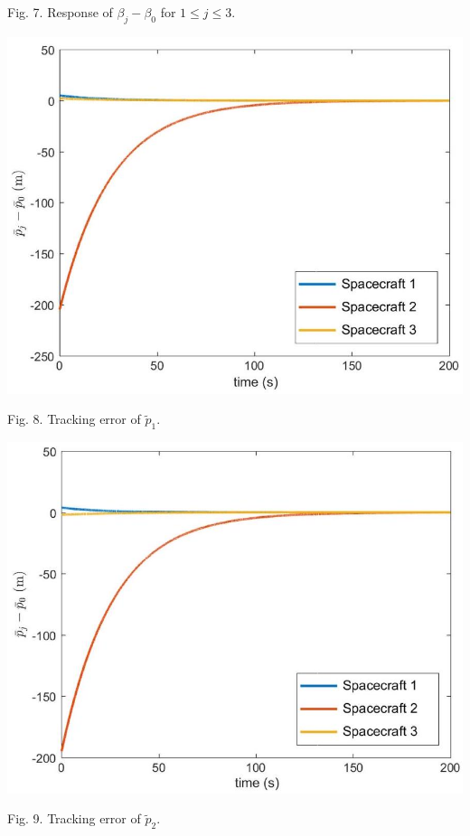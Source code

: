 \documentclass[10pt]{article}
\begin{document}
Fig. 7. Response of $\beta_{j}-\beta_{0}$ for $1 \leq j \leq 3$.

\begin{center}
\includegraphics[max width=\textwidth]{2023_10_07_a50fd94fd281fe9896c1g-08}
\end{center}

Fig. 8. Tracking error of $\tilde{p}_{1}$.

\begin{center}
\includegraphics[max width=\textwidth]{2023_10_07_a50fd94fd281fe9896c1g-08(3)}
\end{center}

Fig. 9. Tracking error of $\tilde{p}_{2}$.
\end{document}
